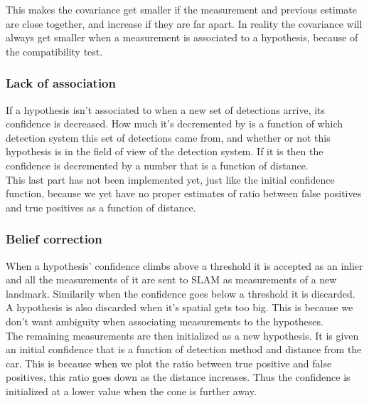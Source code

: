 This makes the covariance get smaller if the measurement and previous estimate are close together, and increase if they are far apart. In reality the covariance will always get smaller when a measurement is associated to a hypothesis, because of the compatibility test. \\

\subsubsection{Lack of association}

If a hypothesis isn't associated to when a new set of detections arrive, its confidence is decreased. How much it's decremented by is a function of which detection system this set of detections came from, and whether or not this hypothesis is in the field of view of the detection system. If it is then the confidence is decremented by a number that is a function of distance. \\

This last part has not been implemented yet, just like the initial confidence function, because we yet have no proper estimates of ratio between false positives and true positives as a function of distance. \\

\subsubsection{Belief correction}

When a hypothesis' confidence climbs above a threshold it is accepted as an inlier and all the measurements of it are sent to SLAM as measurements of a new landmark. Similarily when the confidence goes below a threshold it is discarded. A hypothesis is also discarded when it's spatial gets too big. This is because we don't want ambiguity when associating measurements to the hypotheses. \\

The remaining measurements are then initialized as a new hypothesis. It is given an initial confidence that is a function of detection method and distance from the car. This is because when we plot the ratio between true positive and false positives, this ratio goes down as the distance increases. Thus the confidence is initialized at a lower value when the cone is further away. \\

